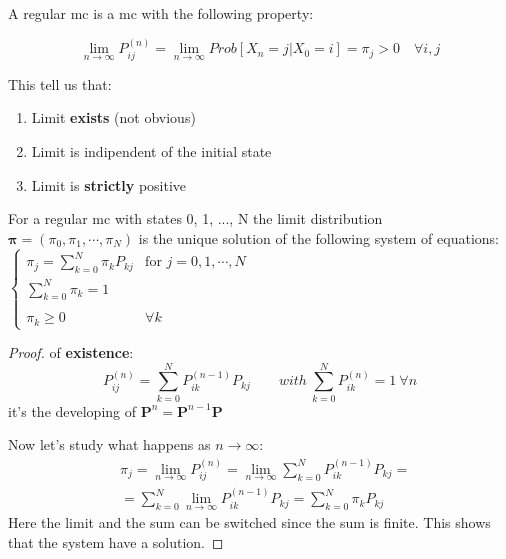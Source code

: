 	\begin{definition}
		A regular \gls{mc} is a \gls{mc} with the following property:

		\begin{equation} \lim_{n \to \infty} P_{ij}^{(n)} = \lim_{ n \to \infty} Prob[ X_n=j | X_0 =i] = \pi_j > 0 \quad \forall i, j \end{equation}

	\end{definition}

	This tell us that:
	\begin{enumerate}
		\item Limit \textbf{exists} (not obvious)
		\item Limit is indipendent of the initial state
		\item Limit is \textbf{strictly} positive
	\end{enumerate}

	\begin{theorem}
		For a regular \gls{mc} with states 0, 1, ..., N the limit distribution $\bm\pi = (\pi_0,\pi_1,\cdots,\pi_N)$ is the unique solution of the following system of equations:\\

		$\begin{cases}
			\pi_j = \sum\limits_{k=0}^N \pi_k P_{k j} & \text{for } j = 0,1, \cdots, N \\
			\sum\limits_{k=0}^N \pi_k = 1\\
			\\ \pi_k \ge 0 & \forall k
		\end{cases}$
	\end{theorem}

	\begin{proof} of \textbf{existence}:
		\begin{equation}
  			P_{i j}^{(n)} = \sum\limits_{k=0}^N P_{ik}^{(n-1)} P_{k j}
			\qquad with ~\sum\limits_{k=0}^N P_{ik}^{(n)} = 1 ~\forall n
		\end{equation}
		it's the developing of $\bm P^n = \bm P^{n-1} \bm P$

		Now let's study what happens as $ n \to \infty $:
		\begin{equation}
			\begin{split}
				&\pi_j = \lim_{n \to \infty} P_{ij}^{(n)} = \lim_{n \to \infty} \sum\limits_{k=0}^N P_{ik}^{(n-1)} P_{k j
				} =\\
				&= \sum\limits_{k=0}^N \lim_{n \to \infty} P_{ik}^{(n-1)} P_{k j
				} = \sum\limits_{k=0}^N \pi_k P_{kj}
			\end{split}
		\end{equation}
		Here the limit and the sum can be switched since the sum is finite.
		This shows that the system have a solution.
	\end{proof}

